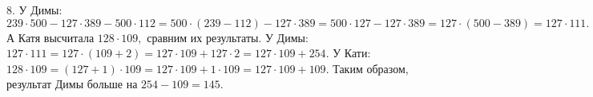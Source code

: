 8. У Димы: $239\cdot500-127\cdot389-500\cdot112=500\cdot(239-112)-127\cdot389=500\cdot127-127\cdot389=127\cdot(500-389)=127\cdot111.$ А Катя высчитала $128\cdot109,$ сравним их результаты. У Димы: $127\cdot111=127\cdot(109+2)=127\cdot109+127\cdot2=127\cdot109+254.$ У Кати: $128\cdot109=(127+1)\cdot109=127\cdot109+1\cdot109=127\cdot109+109.$ Таким образом, результат Димы больше на $254-109=145.$\\
